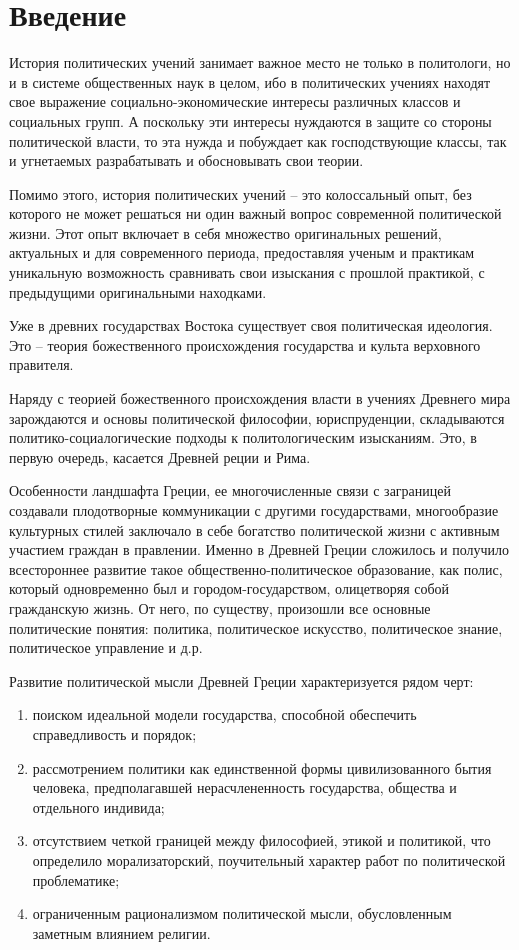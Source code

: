 \chapter{Введение}
  История политических учений занимает важное место не только в политологи, 
	но и в системе общественных наук в целом, ибо в политических учениях 
	находят свое выражение социально-экономические интересы различных классов 
	и социальных групп. А поскольку эти интересы нуждаются в защите со 
	стороны политической власти, то эта нужда и побуждает как господствующие 
	классы, так и угнетаемых разрабатывать и обосновывать свои теории.

	Помимо этого, история политических учений -- это колоссальный опыт, без 
	которого не может решаться ни один важный вопрос современной политической 
	жизни. Этот опыт включает в себя множество оригинальных решений, 
	актуальных и для современного периода, предоставляя ученым и практикам 
	уникальную возможность сравнивать свои изыскания с прошлой практикой, с 
	предыдущими оригинальными находками.

	Уже в древних государствах Востока существует своя политическая идеология. 
	Это -- теория божественного происхождения государства и культа верховного 
	правителя.

	Наряду с теорией божественного происхождения власти в учениях Древнего мира 
	зарождаются и основы политической философии, юриспруденции, складываются 
	политико-социалогические подходы к политологическим изысканиям. Это, в 
	первую очередь, касается Древней реции и Рима.

	Особенности ландшафта Греции, ее многочисленные связи с заграницей 
	создавали плодотворные коммуникации с другими государствами, многообразие 
	культурных стилей заключало в себе богатство политической жизни с активным 
	участием граждан в правлении. Именно в Древней Греции сложилось и получило 
	всестороннее развитие такое общественно-политическое образование, как 
	полис, который одновременно был и городом-государством, олицетворяя собой 
	гражданскую жизнь. От него, по существу, произошли все основные 
	политические понятия: политика, политическое искусство, политическое 
	знание, политическое управление и д.р.

	Развитие политической мысли Древней Греции характеризуется рядом черт:
	\begin{enumerate}
		\item поиском идеальной модели государства, способной обеспечить 
			справедливость и порядок;
		\item рассмотрением политики как единственной формы цивилизованного 
			бытия человека, предполагавшей нерасчлененность государства, 
			общества и отдельного индивида;
		\item отсутствием четкой границей между философией, этикой и 
			политикой, что определило морализаторский, поучительный характер 
			работ по политической проблематике;
		\item ограниченным рационализмом политической мысли, обусловленным 
			заметным влиянием религии. 
	\end{enumerate}

